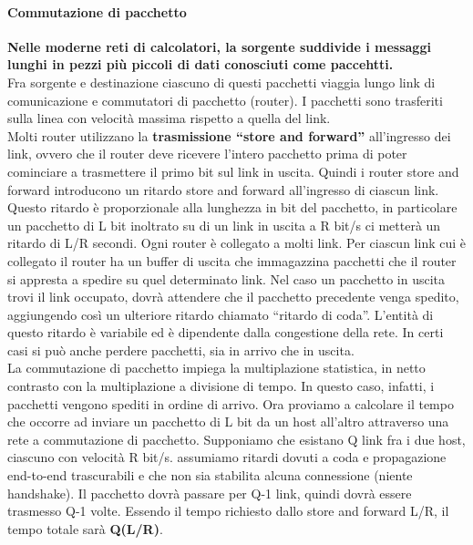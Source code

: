 \documentclass[11pt,a4paper]{article}
\begin{document}
\paragraph{Commutazione di pacchetto}
\textbf{Nelle moderne reti di calcolatori, la sorgente suddivide i messaggi lunghi in pezzi più piccoli di dati conosciuti come paccehtti.} \\
Fra sorgente e destinazione ciascuno di questi pacchetti viaggia lungo link di comunicazione e commutatori di pacchetto (router). I pacchetti sono trasferiti sulla linea con velocità massima rispetto a quella del link. \\
Molti router utilizzano la \textbf{trasmissione “store and forward”} all’ingresso dei link, ovvero che il router deve ricevere l’intero pacchetto prima di poter cominciare a trasmettere il primo bit sul link in uscita. Quindi i router store and forward introducono un ritardo store and forward all’ingresso di ciascun link. Questo ritardo è proporzionale alla lunghezza in bit del pacchetto, in particolare un pacchetto di L bit inoltrato su di un link in uscita a R bit/s ci metterà un ritardo di L/R secondi.
Ogni router è collegato a molti link. Per ciascun link cui è collegato il router ha un buffer di uscita che immagazzina pacchetti che il router si appresta a spedire su quel determinato link. Nel caso un pacchetto in uscita trovi il link occupato, dovrà attendere che il pacchetto precedente venga spedito, aggiungendo così un ulteriore ritardo chiamato “ritardo di coda”. L’entità di questo ritardo è variabile ed è dipendente dalla congestione della rete. In certi casi si può anche perdere pacchetti, sia in arrivo che in uscita. \\
La commutazione di pacchetto impiega la multiplazione statistica, in netto contrasto con la multiplazione a divisione di tempo. In questo caso, infatti, i pacchetti vengono spediti in ordine di arrivo.
Ora proviamo a calcolare il tempo che occorre ad inviare un pacchetto di L bit da un host all’altro attraverso una rete a commutazione di pacchetto. Supponiamo che esistano Q link fra i due host, ciascuno con velocità R bit/s. assumiamo ritardi dovuti a coda e propagazione end-to-end trascurabili e che non sia stabilita alcuna connessione (niente handshake). Il pacchetto dovrà passare per Q-1 link, quindi dovrà essere trasmesso Q-1 volte. Essendo il tempo richiesto dallo store and forward L/R, il tempo totale sarà \textbf{Q(L/R)}.
\end{document}
